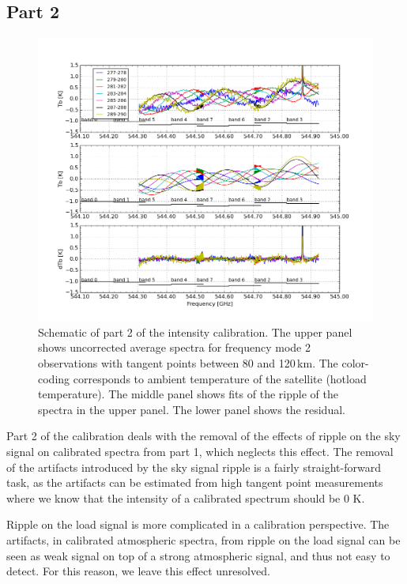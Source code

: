 \subsection*{Part 2}

\begin{figure}[t]
\includegraphics[width=14cm]{calibration_step2_fig.png}
\caption{Schematic of part 2 of the intensity calibration.
The upper panel shows uncorrected average spectra for frequency mode 2 observations
with tangent points between 80 and 120\,km. The color-coding corresponds
to ambient temperature of the satellite (hotload temperature).
The middle panel shows fits of the ripple of the spectra in the 
upper panel. The lower panel shows the residual.}
\label{fig:ripple1}
\end{figure}



Part 2 of the calibration deals with the removal
of the effects of ripple on the sky signal on calibrated
spectra from part 1, which neglects this effect.
The removal of the artifacts introduced by the sky signal
ripple is a fairly straight-forward task, as the artifacts
can be estimated from high tangent point measurements
where we know that the intensity of a calibrated spectrum should be 0 K.

Ripple on the load signal is more complicated in 
a calibration perspective. The artifacts, in calibrated
atmospheric spectra, from ripple on the
load signal can be seen as weak signal on top of a strong
atmospheric signal, and thus not easy to detect.
For this reason, we leave this effect unresolved.

